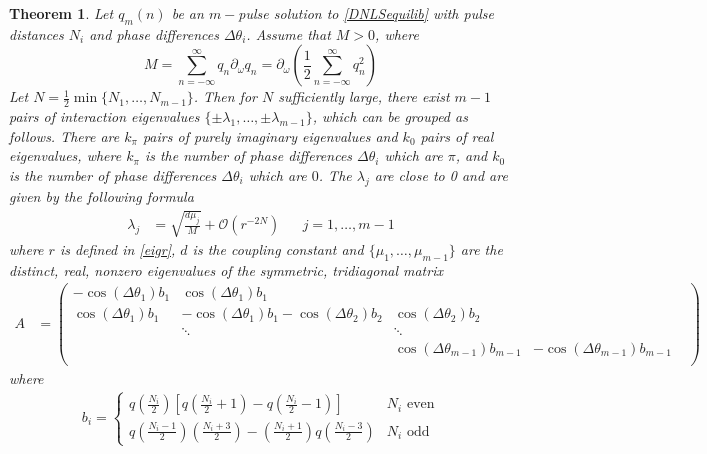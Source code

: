 \documentclass[12pt]{elsarticle}
\newtheorem{theorem}{Theorem}
\begin{document}
\begin{theorem}\label{DNLSeigtheorem}
Let $q_m(n)$ be an $m-$pulse solution to \eqref{DNLSequilib} with pulse distances $N_i$ and phase differences $\Delta\theta_i$. Assume that $M > 0$, where
\[
M = \sum_{n=-\infty}^\infty q_n \partial_\omega q_n = \partial_\omega \left( \frac{1}{2} \sum_{n=-\infty}^\infty q_n^2 \right)
\]
Let $N = \frac{1}{2} \min\{ N_1, \dots, N_{m-1}\}$. Then for $N$ sufficiently large, there exist $m-1$ pairs of interaction eigenvalues $\{\pm \lambda_1, \dots, \pm \lambda_{m-1}\}$, which can be grouped as follows. There are $k_\pi$ pairs of purely imaginary eigenvalues and $k_0$ pairs of real eigenvalues, where $k_\pi$ is the number of phase differences $\Delta\theta_i$ which are $\pi$, and $k_0$ is the number of phase differences $\Delta\theta_i$ which are $0$. The $\lambda_j$ are close to 0 and are given by the following formula
\begin{align}\label{eigsDNLS}
\lambda_j &= \sqrt{\frac{d \mu_j}{M}} + \mathcal{O}(r^{-2N}) && j = 1, \dots, m-1
\end{align}
where $r$ is defined in \eqref{eigr}, $d$ is the coupling
constant and $\{ \mu_1, \dots, \mu_{m-1} \}$ are the distinct, real, nonzero eigenvalues of the symmetric, tridiagonal matrix
\begin{align}\label{DNLSmatrixA}
A &= \begin{pmatrix}
-\cos(\Delta\theta_1) b_1 & \cos(\Delta\theta_1) b_1 & & &  \\
\cos(\Delta\theta_1) b_1 & -\cos(\Delta\theta_1) b_1 - \cos(\Delta\theta_2) b_2 & \cos(\Delta\theta_2) b_2 \\
& \ddots & \ddots \\
& &  \cos(\Delta\theta_{m-1}) b_{m-1} & -\cos(\Delta\theta_{m-1}) b_{m-1}  \\
\end{pmatrix}
\end{align}
where
\begin{align}\label{bieq}
b_i = \begin{cases}
q\left(\frac{N_i}{2}\right) \left[ q\left(\frac{N_i}{2} + 1\right) - q\left(\frac{N_i}{2} - 1\right) \right] & N_i \text{ even} \\
q\left(\frac{N_i-1}{2}\right)\left(\frac{N_i+3}{2}\right) 
- \left(\frac{N_i+1}{2}\right)q\left(\frac{N_i-3}{2}\right) & N_i \text{ odd}
\end{cases}
\end{align}
\end{theorem}
\end{document}
